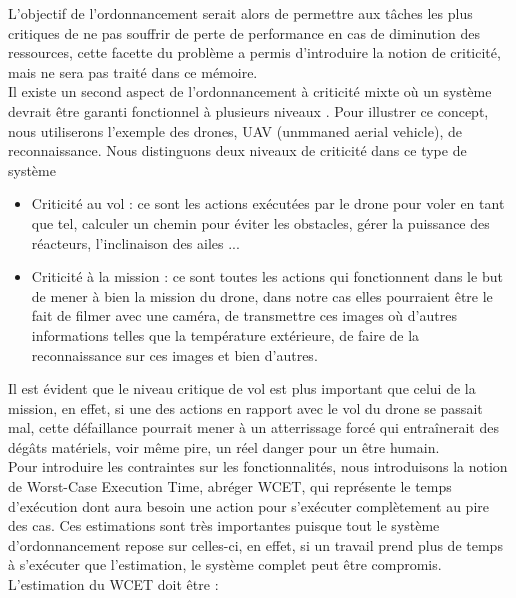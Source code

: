 \documentclass[a4paper]{report}
\theoremstyle{break}
\theoremstyle{breakplain}
\begin{document}
L'objectif de l'ordonnancement serait alors de permettre aux tâches les plus critiques de ne pas souffrir de perte de performance en cas de diminution des ressources, cette facette du problème a permis d'introduire la notion de criticité, mais ne sera pas traité dans ce mémoire.\\

Il existe un second aspect de l'ordonnancement à criticité mixte où un système devrait être garanti fonctionnel à plusieurs niveaux \cite{barhorst2009research}. Pour illustrer ce concept, nous utiliserons l'exemple des drones, UAV (unmmaned aerial vehicle), de reconnaissance. Nous distinguons deux niveaux de criticité dans ce type de système

\begin{itemize}
\item Criticité au vol : ce sont les actions exécutées par le drone pour voler en tant que tel, calculer un chemin pour éviter les obstacles, gérer la puissance des réacteurs, l'inclinaison des ailes ...
\item Criticité à la mission : ce sont toutes les actions qui fonctionnent dans le but de mener à bien la mission du drone, dans notre cas elles pourraient être le fait de filmer avec une caméra, de transmettre ces images où d'autres informations telles que la température extérieure, de faire de la reconnaissance sur ces images et bien d'autres.
\end{itemize}

Il est évident que le niveau critique de vol est plus important que celui de la mission, en effet, si une des actions en rapport avec le vol du drone se passait mal, cette défaillance pourrait mener à un atterrissage forcé qui entraînerait des dégâts matériels, voir même pire, un réel danger pour un être humain.\\

Pour introduire les contraintes sur les fonctionnalités, nous introduisons la notion de Worst-Case Execution Time, abréger WCET, qui représente le temps d'exécution dont aura besoin une action pour s'exécuter complètement au pire des cas. Ces estimations sont très importantes puisque tout le système d'ordonnancement repose sur celles-ci, en effet, si un travail prend plus de temps à s'exécuter que l'estimation, le système complet peut être compromis. L'estimation du WCET doit être \cite{santy2012ordonnancement} :
\end{document}
